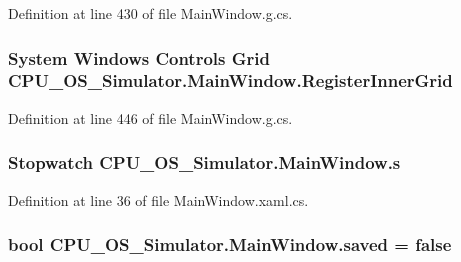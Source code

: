 Definition at line 430 of file Main\+Window.\+g.\+cs.

\hypertarget{class_c_p_u___o_s___simulator_1_1_main_window_a27d2d9e2ed92e2daa444ca8086a0861e}{}
\subsubsection[{Register\+Inner\+Grid}]{\setlength{\rightskip}{0pt plus 5cm}System Windows Controls Grid C\+P\+U\+\_\+\+O\+S\+\_\+\+Simulator.\+Main\+Window.\+Register\+Inner\+Grid\hspace{0.3cm}{\ttfamily [package]}}\label{class_c_p_u___o_s___simulator_1_1_main_window_a27d2d9e2ed92e2daa444ca8086a0861e}


Definition at line 446 of file Main\+Window.\+g.\+cs.

\hypertarget{class_c_p_u___o_s___simulator_1_1_main_window_a880dc01f7c4f093b77ace064d93be1f3}{}
\subsubsection[{s}]{\setlength{\rightskip}{0pt plus 5cm}Stopwatch C\+P\+U\+\_\+\+O\+S\+\_\+\+Simulator.\+Main\+Window.\+s\hspace{0.3cm}{\ttfamily [private]}}\label{class_c_p_u___o_s___simulator_1_1_main_window_a880dc01f7c4f093b77ace064d93be1f3}


Definition at line 36 of file Main\+Window.\+xaml.\+cs.

\hypertarget{class_c_p_u___o_s___simulator_1_1_main_window_afcd7446d65f9b9370ddf07499c2b8113}{}
\subsubsection[{saved}]{\setlength{\rightskip}{0pt plus 5cm}bool C\+P\+U\+\_\+\+O\+S\+\_\+\+Simulator.\+Main\+Window.\+saved = false\hspace{0.3cm}{\ttfamily [private]}}\label{class_c_p_u___o_s___simulator_1_1_main_window_afcd7446d65f9b9370ddf07499c2b8113}


